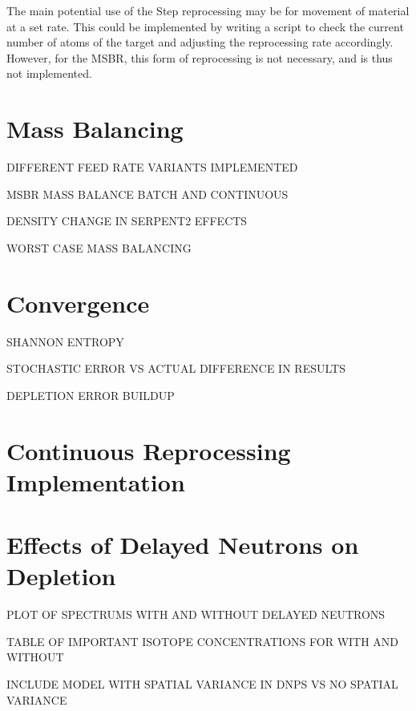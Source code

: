 The main potential use of the Step reprocessing may be for movement of material at a set rate. This could be implemented by writing a script to check the current number of atoms of the target and adjusting the reprocessing rate accordingly. However, for the MSBR, this form of reprocessing is not necessary, and is thus not implemented.

\section{Mass Balancing}

DIFFERENT FEED RATE VARIANTS IMPLEMENTED

MSBR MASS BALANCE BATCH AND CONTINUOUS

DENSITY CHANGE IN SERPENT2 EFFECTS

WORST CASE MASS BALANCING

\section{Convergence}

SHANNON ENTROPY

STOCHASTIC ERROR VS ACTUAL DIFFERENCE IN RESULTS

DEPLETION ERROR BUILDUP

\section{Continuous Reprocessing Implementation}

\section{Effects of Delayed Neutrons on Depletion}

PLOT OF SPECTRUMS WITH AND WITHOUT DELAYED NEUTRONS

TABLE OF IMPORTANT ISOTOPE CONCENTRATIONS FOR WITH AND WITHOUT

INCLUDE MODEL WITH SPATIAL VARIANCE IN DNPS VS NO SPATIAL VARIANCE



